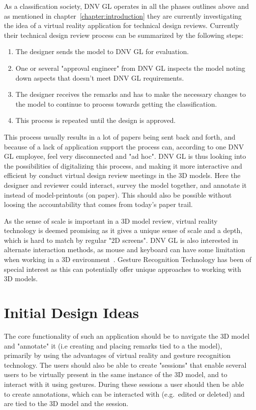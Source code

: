 As a classification society, DNV GL operates in all the phases outlines above and as mentioned in chapter~\vref{chapter:introduction} they are 
currently investigating the idea of a virtual reality application for technical design reviews. 
Currently their technical design review process can be summarized by the following steps: 

\begin{enumerate}
	\item The designer sends the model to DNV GL for evaluation.
	\item One or several "approval engineer" from DNV GL inspects the model noting down aspects that doesn't meet DNV GL requirements.
	\item The designer receives the remarks and has to make the necessary changes to the model to continue to process towards getting the classification.
	\item This process is repeated until the design is approved.
\end{enumerate}

This process usually results in a lot of papers being sent back and forth, and because of a lack of application support the process can, according to one DNV GL employee,
feel very disconnected and "ad hoc". 
DNV GL is thus looking into the possibilities of digitalizing this process, and making it more interactive and efficient by 
conduct virtual design review meetings in the 3D models. Here the designer and reviewer could interact, 
survey the model together, and annotate it instead of model-printouts (on paper). This should also be possible 
without loosing the accountability that comes from today’s paper trail.

As the sense of scale is important in a 3D model review, virtual reality technology is deemed promising as it gives a unique sense of scale
and a depth, which is hard to match by regular "2D screens". 
DNV GL is also interested in alternate interaction methods, as mouse and keyboard can have some limitation when working in a 3D environment~\citep{Rautaray2015}. 
Gesture Recognition Technology has been of special interest as this can potentially offer unique approaches to working with 3D models.

\section{Initial Design Ideas}
The core functionality of such an application should be to navigate the 3D model and "annotate" it (i.e creating and placing remarks tied to a the model), 
primarily by using the advantages of virtual reality and gesture recognition technology. 
The users should also be able to create "sessions" that enable several users to be virtually present 
in the same instance of the 3D model, and to interact with it using gestures. During these sessions a user should then be able to create annotations, 
which can be interacted with (e.g.~edited or deleted) and are tied to the 3D model and the session. 

